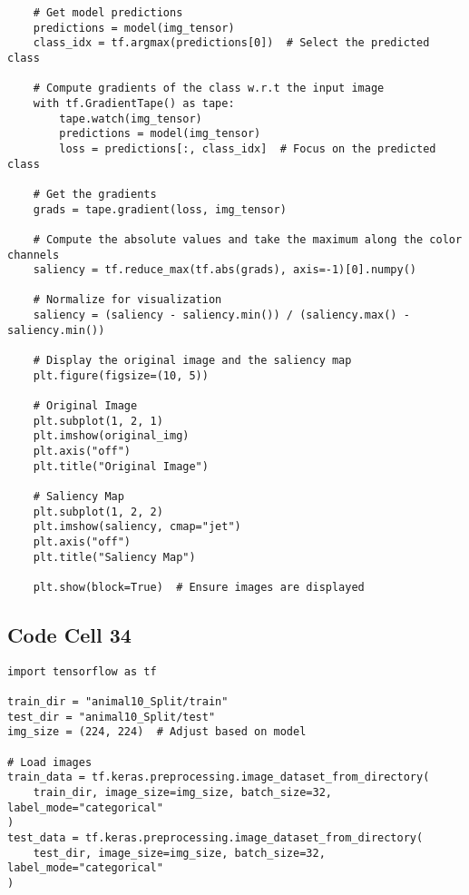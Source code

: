 \documentclass{article}
\begin{document}
\begin{lstlisting}
    # Get model predictions
    predictions = model(img_tensor)
    class_idx = tf.argmax(predictions[0])  # Select the predicted class

    # Compute gradients of the class w.r.t the input image
    with tf.GradientTape() as tape:
        tape.watch(img_tensor)
        predictions = model(img_tensor)
        loss = predictions[:, class_idx]  # Focus on the predicted class

    # Get the gradients
    grads = tape.gradient(loss, img_tensor)

    # Compute the absolute values and take the maximum along the color channels
    saliency = tf.reduce_max(tf.abs(grads), axis=-1)[0].numpy()

    # Normalize for visualization
    saliency = (saliency - saliency.min()) / (saliency.max() - saliency.min())

    # Display the original image and the saliency map
    plt.figure(figsize=(10, 5))

    # Original Image
    plt.subplot(1, 2, 1)
    plt.imshow(original_img)
    plt.axis("off")
    plt.title("Original Image")

    # Saliency Map
    plt.subplot(1, 2, 2)
    plt.imshow(saliency, cmap="jet")
    plt.axis("off")
    plt.title("Saliency Map")

    plt.show(block=True)  # Ensure images are displayed
\end{lstlisting}

\subsection*{Code Cell 34}
\begin{lstlisting}
import tensorflow as tf

train_dir = "animal10_Split/train"
test_dir = "animal10_Split/test"
img_size = (224, 224)  # Adjust based on model

# Load images
train_data = tf.keras.preprocessing.image_dataset_from_directory(
    train_dir, image_size=img_size, batch_size=32, label_mode="categorical"
)
test_data = tf.keras.preprocessing.image_dataset_from_directory(
    test_dir, image_size=img_size, batch_size=32, label_mode="categorical"
)
\end{lstlisting}
\end{document}
